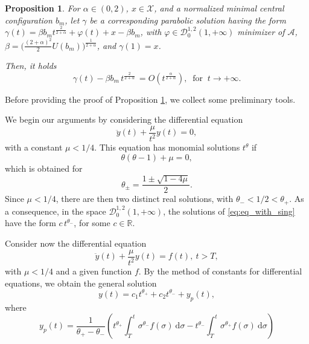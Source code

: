 \documentclass[a4paper,10pt]{amsart}
\newcommand{\ud}{\mathrm{d}}
\theoremstyle{plain}
\newtheorem{prop}[thm]{Proposition}
\theoremstyle{definition}
\numberwithin{equation}{section}
\numberwithin{thm}{section}
\begin{document}
\begin{prop}
\label{prop:asymptotic_par}
    For $\alpha \in (0,2)$, $x \in \mathcal X$, and a normalized minimal central configuration $b_m$, let $\gamma$ be a corresponding parabolic solution having the form $\gamma(t) = \beta b_mt^{\frac{2}{2+\alpha}}+\varphi(t)+x-\beta b_m$, with $\varphi\in\mathcal{D}_0^{1,2}(1,+\infty)$ minimizer of $\mathcal A$, $\beta = \big({\frac{(2+\alpha)^2}{2}U(b_m)}\big)^{\frac{1}{2+\alpha}}$, and $\gamma(1)=x$. 
    
    Then, it holds
    \begin{equation}
    \label{eq:asymp}
    \gamma(t)-\beta b_m\,t^\frac{2}{2+\alpha}\,  =O(t^\frac{\alpha}{2+\alpha}), \ \mbox{ for } \ t \rightarrow+\infty.
    \end{equation}
\end{prop}


Before providing the proof of Proposition \ref{prop:asymptotic_par}, we collect some preliminary tools.



We begin our arguments by considering the differential equation
\begin{equation}
    \label{eq:eq_with_sing}
    \ddot{y}(t) + \frac{\mu}{t^2}y(t) = 0,
\end{equation}
with a constant $\mu<1/4$. This equation has monomial solutions $t^\theta$ if
\[
\theta(\theta-1)+\mu=0,
\]
which is obtained for 
\[
\theta_\pm = \frac{1\pm\sqrt{1-4\mu}}{2}.
\]
Since $\mu<1/4$, there are then two distinct real solutions, with $\theta_- < 1/2 < \theta_+$. As a consequence, in the space $\mathcal{D}_0^{1,2}(1,+\infty)$, the solutions of \eqref{eq:eq_with_sing} have the form $c\,t^{\theta_-}$, for some $c\in \mathbb R$.

\smallskip

Consider now the differential equation
\begin{equation}
\label{eq:mu_f}
\ddot{y}(t) + \frac{\mu}{t^2}y(t) = f(t), \ t> T,
\end{equation}
with $\mu<1/4$ and a given function $f$. By the method of constants for differential equations, we obtain the general solution
\begin{equation}
    \label{eq:genereal_sol}
    y(t) = c_1 t^{\theta_+} + c_2 t^{\theta_-} + y_p(t),
\end{equation}
where
\begin{equation}
    \label{eq:particular_sol}
    y_p(t)= \frac{1}{\theta_+-\theta_-}\left(t^{\theta_+}\int_{T}^{t} \sigma^{\theta_-} f(\sigma)\ \ud \sigma - t^{\theta_-}\int_{T}^{t} \sigma^{\theta_+}f(\sigma)\ \ud \sigma\right)
\end{equation}
\end{document}
